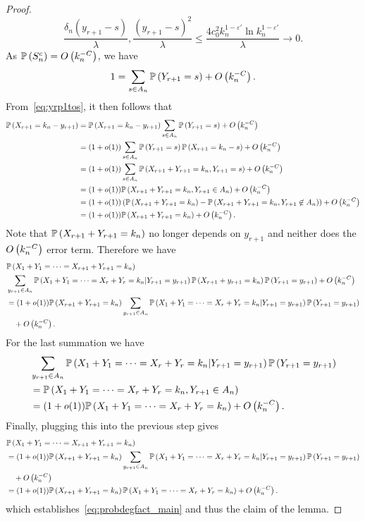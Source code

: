 \begin{proof}
\[
	\frac{\delta_n(y_{r+1}-s)}{\lambda}, \frac{(y_{r+1}-s)^2}{\lambda} \leq \frac{4c_0^2 k_n^{1-\varepsilon'}\ln k_n^{1-\varepsilon'}}{\lambda}  \rightarrow 0.
\]
As $\mathbb{P}\left(S_n^c\right)=O\left(k_n^{-C}\right)$, we have
\begin{align*}
	1=\sum_{s\in A_n}\mathbb{P}\left(Y_{r+1}=s\right)+O\left(k_n^{-C}\right).
\end{align*}
From~\eqref{eq:yrp1tos}, it then follows that
\begin{align*}
	\mathbb{P}\left(X_{r+1}=k_n-y_{r+1}\right) 
	&=\mathbb{P}\left(X_{r+1}=k_n-y_{r+1}\right) \sum_{s\in A_n} \mathbb{P}\left(Y_{r+1}=s\right)+O\left(k_n^{-C}\right)\\
	&= (1+o(1)) \sum_{s\in A_n} \mathbb{P}\left(Y_{r+1}=s\right) \mathbb{P}\left(X_{r+1}=k_n-s\right)+O\left(k_n^{-C}\right) \\
	&=(1+o(1))\sum_{s\in A_n} \mathbb{P}\left(X_{r+1}+Y_{r+1}=k_n, Y_{r+1}=s\right)+O\left(k_n^{-C}\right) \\
	&=(1+o(1))\mathbb{P}\left(X_{r+1}+Y_{r+1}=k_n, Y_{r+1}\in A_n\right)+O\left(k_n^{-C}\right) \\
	&=(1+o(1))\left(\mathbb{P}\left(X_{r+1}+Y_{r+1}=k_n\right)-\mathbb{P}\left(X_{r+1}+Y_{r+1}=k_n, Y_{r+1}\not \in A_n\right)\right)+O\left(k_n^{-C}\right) \\
	&=(1+o(1))\mathbb{P}\left(X_{r+1}+Y_{r+1}=k_n\right)+O\left(k_n^{-C}\right).
\end{align*}
Note that $\mathbb{P}\left(X_{r+1}+Y_{r+1}=k_n\right)$ no longer depends on $y_{r+1}$ and neither does the $O\left(k_n^{-C}\right)$ error term. Therefore we have
\begin{align*}
	&\mathbb{P}\left(X_1+Y_1=\dots=X_{r+1}+Y_{r+1}=k_n\right) \\
	&\sum_{y_{r+1} \in A_n} \mathbb{P}\left(X_1+Y_1=\dots=X_{r}+Y_r=k_n|Y_{r+1}=y_{r+1}\right) 	
		\mathbb{P}\left(X_{r+1}+y_{r+1}=k_n\right)\mathbb{P}\left(Y_{r+1}=y_{r+1}\right)+O\left(k_n^{-C}\right)\\
	&=(1+o(1))\mathbb{P}\left(X_{r+1}+Y_{r+1}=k_n\right)\sum_{y_{r+1} \in A_n} 	
		\mathbb{P}\left(X_1+Y_1=\dots=X_{r}+Y_r=k_n|Y_{r+1}=y_{r+1}\right)\mathbb{P}\left(Y_{r+1}=y_{r+1}\right)\\
	&\hspace{10pt}+O\left(k_n^{-C}\right).
\end{align*}
For the last summation we have
\begin{align*}
	&\sum_{y_{r+1} \in A_n} \mathbb{P}\left(X_1+Y_1=\dots=X_{r}+Y_r=k_n|Y_{r+1}=y_{r+1}\right)\mathbb{P}\left(Y_{r+1}=y_{r+1}\right) \\
	&= \mathbb{P}\left(X_1+Y_1=\dots=X_r+Y_r=k_n,Y_{r+1}\in A_n\right) \\
	&= (1+o(1))\mathbb{P}\left(X_1+Y_1=\dots=X_r+Y_r=k_n\right)+O\left(k_n^{-C}\right).
\end{align*}
Finally, plugging this into the previous step gives 
\begin{align*}
	&\mathbb{P}\left(X_1+Y_1=\dots=X_{r+1}+Y_{r+1}=k_n\right) \\
	&=(1+o(1))\mathbb{P}\left(X_{r+1}+Y_{r+1}=k_n\right)\sum_{y_{r+1} \in A_n} 	
		\mathbb{P}\left(X_1+Y_1=\dots=X_{r}+Y_r=k_n|Y_{r+1}=y_{r+1}\right)\mathbb{P}\left(Y_{r+1}=y_{r+1}\right)\\
	&\hspace{10pt}+O\left(k_n^{-C}\right) \\
	&=(1+o(1))\mathbb{P}\left(X_{r+1}+Y_{r+1}=k_n\right)\mathbb{P}\left(X_1+Y_1=\dots=X_r+Y_r=k_n\right)+O\left(k_n^{-C}\right).
\end{align*}
which establishes~\eqref{eq:probdegfact_main} and thus the claim of the lemma.
\end{proof}

